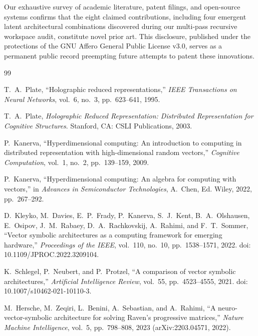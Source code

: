 \documentclass[11pt]{article}
\begin{document}
Our exhaustive survey of academic literature, patent filings, and open-source systems confirms that the eight claimed contributions, including four emergent latent architectural combinations discovered during our multi-pass recursive workspace audit, constitute novel prior art. This disclosure, published under the protections of the GNU Affero General Public License v3.0, serves as a permanent public record preempting future attempts to patent these innovations.

\begin{thebibliography}{99}

T.~A.~Plate, ``Holographic reduced representations,'' \textit{IEEE Transactions on Neural Networks}, vol.~6, no.~3, pp.~623--641, 1995.

T.~A.~Plate, \textit{Holographic Reduced Representation: Distributed Representation for Cognitive Structures}. Stanford, CA: CSLI Publications, 2003.

P.~Kanerva, ``Hyperdimensional computing: An introduction to computing in distributed representation with high-dimensional random vectors,'' \textit{Cognitive Computation}, vol.~1, no.~2, pp.~139--159, 2009.

P.~Kanerva, ``Hyperdimensional computing: An algebra for computing with vectors,'' in \textit{Advances in Semiconductor Technologies}, A.~Chen, Ed. Wiley, 2022, pp.~267--292.

D.~Kleyko, M.~Davies, E.~P.~Frady, P.~Kanerva, S.~J.~Kent, B.~A.~Olshausen, E.~Osipov, J.~M.~Rabaey, D.~A.~Rachkovskij, A.~Rahimi, and F.~T.~Sommer, ``Vector symbolic architectures as a computing framework for emerging hardware,'' \textit{Proceedings of the IEEE}, vol.~110, no.~10, pp.~1538--1571, 2022. doi: 10.1109/JPROC.2022.3209104.

K.~Schlegel, P.~Neubert, and P.~Protzel, ``A comparison of vector symbolic architectures,'' \textit{Artificial Intelligence Review}, vol.~55, pp.~4523--4555, 2021. doi: 10.1007/s10462-021-10110-3.

M.~Hersche, M.~Zeqiri, L.~Benini, A.~Sebastian, and A.~Rahimi, ``A neuro-vector-symbolic architecture for solving Raven's progressive matrices,'' \textit{Nature Machine Intelligence}, vol.~5, pp.~798--808, 2023 (arXiv:2203.04571, 2022).


\end{thebibliography}
\end{document}

